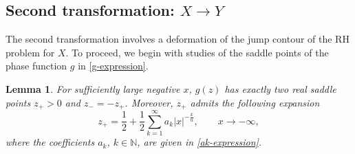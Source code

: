 \documentclass[11pt,a4paper]{article}
\newtheorem{lemma}[thm]{Lemma}
\numberwithin{equation}{section}
\begin{document}
\subsection{Second transformation: $X \to Y$}
The second transformation involves a deformation of the jump contour of the RH problem for $X$.
To proceed, we begin with studies of the saddle points of the phase function $g$ in \eqref{g-expression}.
\begin{lemma}
For sufficiently large negative $x$, $g(z)$ has exactly two real saddle points $z_+>0$ and $z_-=-z_+$. Moreover, $z_+$ admits the following expansion
\begin{equation}\label{z+-expansion}
z_+=\frac{1}{2}+\frac{1}{2}\sum^{\infty}_{k=1}a_k|x|^{-\frac{k}{n}},
\qquad    x \to -\infty,
\end{equation}
where the coefficients $a_k$, $k\in\mathbb{N}$, are given in \eqref{ak-expression}.
\end{lemma}
%
\end{document}
